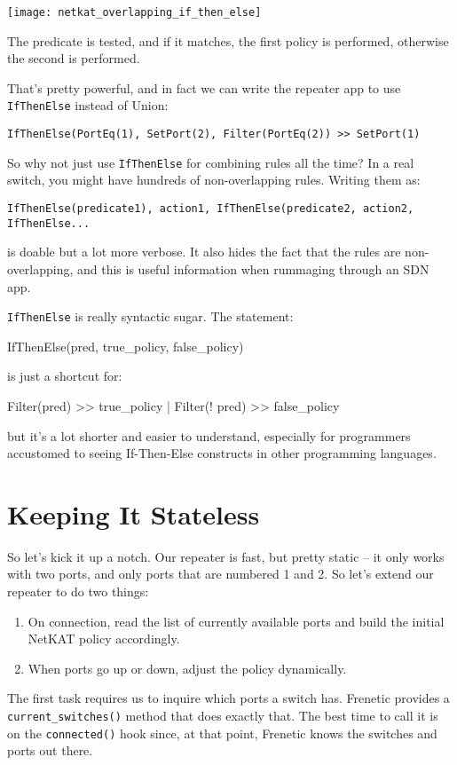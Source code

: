 \texttt{[image: netkat\_overlapping\_if\_then\_else]}

The predicate is tested, and if it matches, the first policy is performed, otherwise the second is performed.

That's pretty powerful, and in fact we can write the repeater app to use \texttt{IfThenElse} instead of Union:

\texttt{IfThenElse(PortEq(1), SetPort(2), Filter(PortEq(2)) >> SetPort(1) }

So why not just use \texttt{IfThenElse} for combining rules all the time?  In a real switch, you might have 
hundreds of non-overlapping rules.  Writing them as:

\texttt{IfThenElse(predicate1), action1, IfThenElse(predicate2, action2, IfThenElse...}

is doable but a lot more verbose.  It also hides the fact that the rules are non-overlapping, and this is useful
information when rummaging through an SDN app. 

\texttt{IfThenElse} is really syntactic sugar.  The statement:

IfThenElse(pred, true\_policy, false\_policy)

is just a shortcut for:

Filter(pred) >> true\_policy | Filter(! pred) >> false\_policy

but it's a lot shorter and easier to understand, especially for programmers accustomed to seeing If-Then-Else
constructs in other programming languages.

\section{Keeping It Stateless}
\label{section:stateless}

So let's kick it up a notch.  
Our repeater is fast, but pretty static -- it only works with two ports, and only ports that are numbered
1 and 2.
So let's extend our repeater to do two things: 

\begin{enumerate}
\item On connection, read the list of currently available ports and build the initial NetKAT policy accordingly.
\item When ports go up or down, adjust the policy dynamically.
\end{enumerate}

The first task requires us to inquire which ports a switch has.  Frenetic provides a \texttt{current\_switches()}
method that does exactly that.   The best time to call it is on the \texttt{connected()} hook since, at that
point, Frenetic knows the switches and ports out there.

